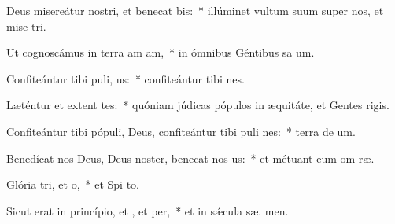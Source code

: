 \item Deus misereátur nostri, et benecat bis:~* illúminet vultum suum super nos, et mise tri.
\item Ut cognoscámus in terra am am,~* in ómnibus Géntibus sa um.
\item Confiteántur tibi puli, us:~* confiteántur tibi  nes.
\item Læténtur et extent tes:~* quóniam júdicas pópulos in æquitáte, et Gentes   rigis.
\item Confiteántur tibi pópuli, Deus, confiteántur tibi puli nes:~* terra de  um.
\item Benedícat nos Deus, Deus noster, benecat nos us:~* et métuant eum om  ræ.
\item Glória tri, et o,~* et Spi to.
\item Sicut erat in princípio, et , et per,~* et in sǽcula sæ. men.
